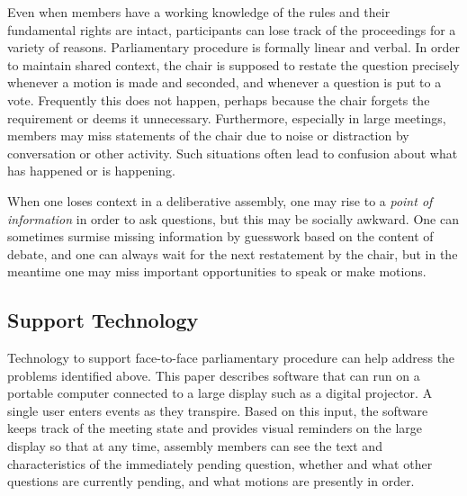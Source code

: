 \documentclass{acm_proc_article-sp}
\begin{document}


Even when members have a working knowledge of the rules and their fundamental rights are intact, participants can lose track of the proceedings for a variety of reasons. Parliamentary procedure is formally linear and verbal. In order to maintain shared context, the chair is supposed to restate the question precisely whenever a motion is made and seconded, and whenever a question is put to a vote. Frequently this does not happen, perhaps because the chair forgets the requirement or deems it unnecessary. Furthermore, especially in large meetings, members may miss statements of the chair due to noise or distraction by conversation or other activity. Such situations often lead to confusion about what has happened or is happening.

When one loses context in a deliberative assembly, one may rise to a \emph{point of information} in order to ask questions, but this may be socially awkward. One can sometimes surmise missing information by guesswork based on the content of debate, and one can always wait for the next restatement by the chair, but in the meantime one may miss important opportunities to speak or make motions.

\subsection{Support Technology}
\label{sec:support-technology}





Technology to support face-to-face parliamentary procedure can help address the problems identified above. This paper describes software that can run on a portable computer connected to a large display such as a digital projector. A single user enters events as they transpire. Based on this input, the software keeps track of the meeting state and provides visual reminders on the large display so that at any time, assembly members can see the text and characteristics of the immediately pending question, whether and what other questions are currently pending, and what motions are presently in order. 
\end{document}
